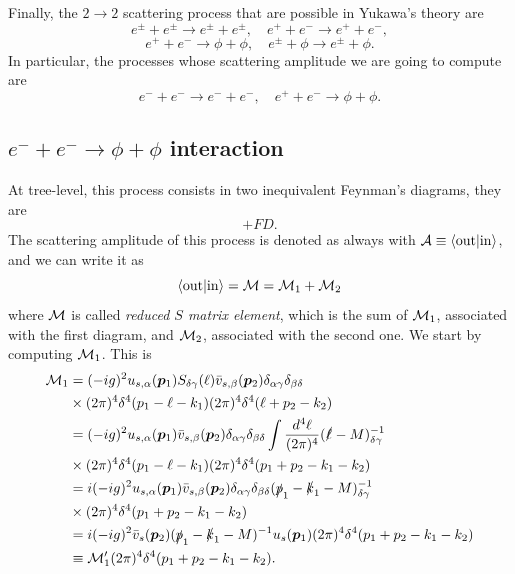 Finally, the $2 \to 2$ scattering process that are possible in Yukawa's theory are 
\begin{equation}
    e^\pm + e^\pm \to e^\pm + e^\pm,\quad e^+ + e^- \to e^+ + e^-,
\end{equation}
\begin{equation}
    e^+ + e^- \to \phi + \phi,\quad e^\pm + \phi \to e^\pm + \phi.
\end{equation}
In particular, the processes whose scattering amplitude we are going to compute are 
\begin{equation}
    e^- + e^- \to e^- + e^-,\quad e^+ + e^- \to \phi + \phi.
\end{equation}

\subsection{\texorpdfstring{$e^- + e^- \to \phi + \phi$}{e+ + e- in 2phi} interaction}
At tree-level, this process consists in two inequivalent Feynman's diagrams, they are 
\begin{equation}
    +FD.
\end{equation}
The scattering amplitude of this process is denoted as always with $\mathcal{A} \equiv \langle \mathrm{out} | \mathrm{in} \rangle$, and we can write it as 
\begin{equation}
    \langle \mathrm{out} | \mathrm{in} \rangle = \mathcal{M} = \mathcal{M}_1 + \mathcal{M}_2
\end{equation}
where $\mathcal{M}$ is called \emph{reduced $S$ matrix element}, which is the sum of $\mathcal{M}_1$, associated with the first diagram, and $\mathcal{M}_2$, associated with the second one. We start by computing $\mathcal{M}_1$. This is 
\begin{equation}
    \begin{split}
        \mathcal{M}_1 &= (-ig)^2u_{s,\alpha}(\bm{p}_1)S_{\delta\gamma}(\ell)\bar{v}_{s,\beta}(\bm{p}_2)\delta_{\alpha\gamma}\delta_{\beta\delta} \\
        &\times (2\pi)^4\delta^4(p_1 - \ell - k_1)(2\pi)^4\delta^4(\ell + p_2 - k_2) \\
        &= (-ig)^2u_{s,\alpha}(\bm{p}_1)\bar{v}_{s,\beta}(\bm{p}_2)\delta_{\alpha\gamma}\delta_{\beta\delta}\int \frac{d^4\ell}{(2\pi)^4}(\slashed{\ell} - M)^{-1}_{\delta\gamma} \\
        &\times (2\pi)^4\delta^4(p_1 - \ell - k_1)(2\pi)^4\delta^4(p_1 + p_2 - k_1 - k_2) \\
        &= i(-ig)^2u_{s,\alpha}(\bm{p}_1)\bar{v}_{s,\beta}(\bm{p}_2)\delta_{\alpha\gamma}\delta_{\beta\delta}(\slashed{p}_1 - \slashed{k}_1 - M)^{-1}_{\delta\gamma} \\
        &\times (2\pi)^4\delta^4(p_1 + p_2 - k_1 - k_2) \\
        &= i(-ig)^2\bar{v}_s(\bm{p}_2)(\slashed{p}_1 - \slashed{k}_1 - M)^{-1}u_s(\bm{p}_1)(2\pi)^4\delta^4(p_1 + p_2 - k_1 - k_2) \\
        &\equiv \mathcal{M}_1'(2\pi)^4\delta^4(p_1 + p_2 - k_1 - k_2).
    \end{split}
\end{equation}
